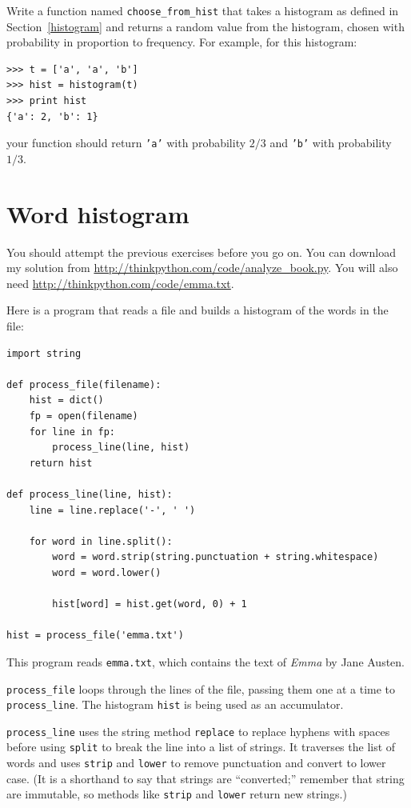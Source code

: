 \documentclass[10pt]{book}
\begin{document}
\begin{CJK}{UTF8}{gbsn}
\begin{exercise}

Write a function named \verb"choose_from_hist" that takes
a histogram as defined in Section~\ref{histogram} and returns a 
random value from the histogram, chosen with probability
in proportion to frequency.  For example, for this histogram:

\begin{verbatim}
>>> t = ['a', 'a', 'b']
>>> hist = histogram(t)
>>> print hist
{'a': 2, 'b': 1}
\end{verbatim}
%
your function should return {\tt 'a'} with probability $2/3$ and {\tt 'b'}
with probability $1/3$.
\end{exercise}


\section{Word histogram}

You should attempt the previous exercises before you go on.
You can download my solution from
 \url{http://thinkpython.com/code/analyze_book.py}.  You will
also need \url{http://thinkpython.com/code/emma.txt}.

Here is a program that reads a file and builds a histogram of the
words in the file:

\begin{verbatim}
import string

def process_file(filename):
    hist = dict()
    fp = open(filename)
    for line in fp:
        process_line(line, hist)
    return hist

def process_line(line, hist):
    line = line.replace('-', ' ')
    
    for word in line.split():
        word = word.strip(string.punctuation + string.whitespace)
        word = word.lower()

        hist[word] = hist.get(word, 0) + 1

hist = process_file('emma.txt')
\end{verbatim}
%
This program reads {\tt emma.txt}, which contains the text of {\em
  Emma} by Jane Austen.

\verb"process_file" loops through the lines of the file,
passing them one at a time to \verb"process_line".  The histogram
{\tt hist} is being used as an accumulator.

\verb"process_line" uses the string method {\tt replace} to replace
hyphens with spaces before using {\tt split} to break the line into a
list of strings.  It traverses the list of words and uses {\tt strip}
and {\tt lower} to remove punctuation and convert to lower case.  (It
is a shorthand to say that strings are ``converted;'' remember that
string are immutable, so methods like {\tt strip} and {\tt lower}
return new strings.)


\end{CJK}
\end{document}
